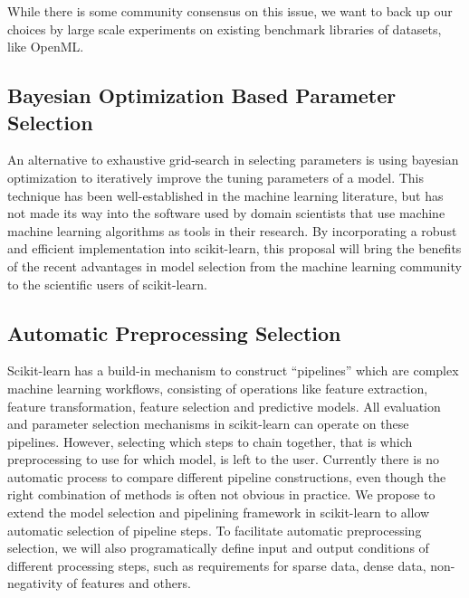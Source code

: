 While there is some community consensus on this issue, we want to back
up our choices by large scale experiments on existing benchmark libraries
of datasets, like OpenML\@.

\subsection{Bayesian Optimization Based Parameter Selection}
An alternative to exhaustive grid-search in selecting parameters is using
bayesian optimization to iteratively improve the tuning parameters of a model.
This technique has been well-established in the machine learning literature,
but has not made its way into the software used by domain scientists that use
machine machine learning algorithms as tools in their research.
By incorporating a robust and efficient implementation into scikit-learn,
this proposal will bring the benefits of the recent advantages in model selection
from the machine learning community to the scientific users of scikit-learn.

\subsection{Automatic Preprocessing Selection}
Scikit-learn has a build-in mechanism to construct ``pipelines'' which are complex 
machine learning workflows, consisting of operations like feature extraction,
feature transformation, feature selection and predictive models.
All evaluation and parameter selection mechanisms in scikit-learn can operate
on these pipelines.
However, selecting which steps to chain together, that is which preprocessing
to use for which model, is left to the user. Currently there is no
automatic process to compare different pipeline constructions, even though
the right combination of methods is often not obvious in practice.
We propose to extend the model selection and pipelining framework in scikit-learn
to allow automatic selection of pipeline steps.
To facilitate automatic preprocessing selection, we will also programatically
define input and output conditions of different processing steps, such
as requirements for sparse data, dense data, non-negativity of features and others.


